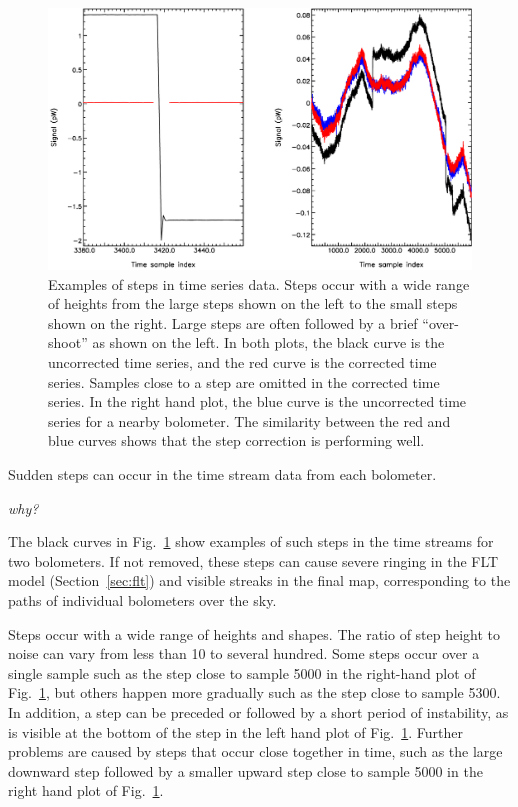 \documentclass[useAMS,usenatbib,nofootinbib]{mn2e}
\begin{document}
\begin{figure}
\centering
\includegraphics[width=\linewidth]{steps1.pdf}
\caption{Examples of steps in time series data. Steps occur with a wide
range of heights from the large steps shown on the left to the small
steps shown on the right. Large steps are often followed by a brief
``over-shoot'' as shown on the left. In both plots, the black curve is
the uncorrected time series, and the red curve is the corrected time
series. Samples close to a step are omitted in the corrected time series.
In the right hand plot, the blue curve is the uncorrected time series for
a nearby bolometer. The similarity between the red and blue curves shows
that the step correction is performing well.
}
\label{fig:steps1}
\end{figure}

Sudden steps can occur in the time stream data from each bolometer.

\emph{why?}

The black curves in Fig.~\ref{fig:steps1} show examples of such steps in
the time streams for two bolometers. If not removed, these steps can
cause severe ringing in the FLT model (Section~\ref{sec:flt}) and visible
streaks in the final map, corresponding to the paths of individual
bolometers over the sky.

Steps occur with a wide range of heights and shapes. The ratio of step
height to noise can vary from less than 10 to several hundred. Some steps
occur over a single sample such as the step close to sample 5000 in the
right-hand plot of Fig.~\ref{fig:steps1}, but others happen more
gradually such as the step close to sample 5300. In addition, a step can
be preceded or followed by a short period of instability, as is visible
at the bottom of the step in the left hand plot of
Fig.~\ref{fig:steps1}. Further problems are caused by steps that occur
close together in time, such as the large downward step followed by a
smaller upward step close to sample 5000 in the right hand plot of
Fig.~\ref{fig:steps1}.
\end{document}
